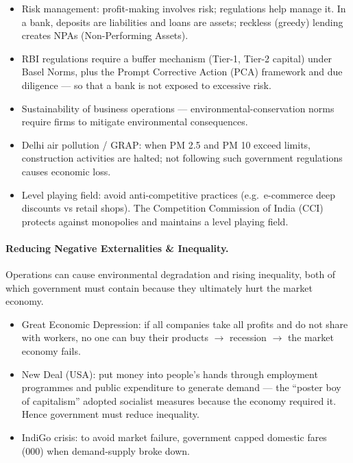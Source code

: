 \begin{GovtPolicy}
\begin{itemize}
\item Risk management: profit-making involves risk; regulations help manage it. In a bank, deposits are liabilities and loans are assets; reckless (greedy) lending creates NPAs (Non-Performing Assets).
\item RBI regulations require a buffer mechanism (Tier-1, Tier-2 capital) under Basel Norms, plus the Prompt Corrective Action (PCA) framework and due diligence --- so that a bank is not exposed to excessive risk.
\item Sustainability of business operations --- environmental-conservation norms require firms to mitigate environmental consequences.
\end{itemize}
\end{GovtPolicy}

\begin{GovtPolicy}
\begin{itemize}
\item Delhi air pollution / GRAP: when PM 2.5 and PM 10 exceed limits, construction activities are halted; not following such government regulations causes economic loss.
\item Level playing field: avoid anti-competitive practices (e.g.\ e-commerce deep discounts vs retail shops). The Competition Commission of India (CCI) protects against monopolies and maintains a level playing field.
\end{itemize}
\end{GovtPolicy}

\paragraph{Reducing Negative Externalities \& Inequality.}
\begin{KeyConcept}
Operations can cause environmental degradation and rising inequality, both of which government must contain because they ultimately hurt the market economy.
\end{KeyConcept}

\begin{ExampleBox}
\begin{itemize}
\item Great Economic Depression: if all companies take all profits and do not share with workers, no one can buy their products $\rightarrow$ recession $\rightarrow$ the market economy fails.
\item New Deal (USA): put money into people's hands through employment programmes and public expenditure to generate demand --- the ``poster boy of capitalism'' adopted socialist measures because the economy required it. Hence government must reduce inequality.
\item IndiGo crisis: to avoid market failure, government capped domestic fares (000) when demand-supply broke down.
\end{itemize}
\end{ExampleBox}

